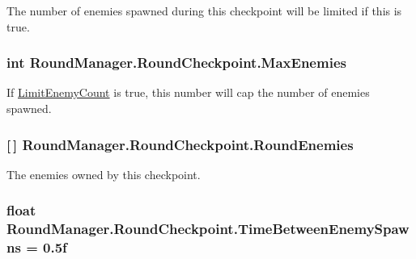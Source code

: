 The number of enemies spawned during this checkpoint will be limited if this is true. 

\hypertarget{class_round_manager_1_1_round_checkpoint_a3a6d5508cf0353445c8114d22e00a69b}{}
\subsubsection[{Max\+Enemies}]{\setlength{\rightskip}{0pt plus 5cm}int Round\+Manager.\+Round\+Checkpoint.\+Max\+Enemies}\label{class_round_manager_1_1_round_checkpoint_a3a6d5508cf0353445c8114d22e00a69b}


If \hyperlink{class_round_manager_1_1_round_checkpoint_a74d49222fa14c7c369334853014f337b}{Limit\+Enemy\+Count} is true, this number will cap the number of enemies spawned. 

\hypertarget{class_round_manager_1_1_round_checkpoint_a9e735b282759700b04092b495e9f902b}{}
\subsubsection[{Round\+Enemies}]{ \mbox{[}$\,$\mbox{]} Round\+Manager.\+Round\+Checkpoint.\+Round\+Enemies}\label{class_round_manager_1_1_round_checkpoint_a9e735b282759700b04092b495e9f902b}


The enemies owned by this checkpoint. 

\hypertarget{class_round_manager_1_1_round_checkpoint_a89a907432354ddb6380327606010b498}{}
\subsubsection[{Time\+Between\+Enemy\+Spawns}]{\setlength{\rightskip}{0pt plus 5cm}float Round\+Manager.\+Round\+Checkpoint.\+Time\+Between\+Enemy\+Spawns = 0.\+5f}\label{class_round_manager_1_1_round_checkpoint_a89a907432354ddb6380327606010b498}


